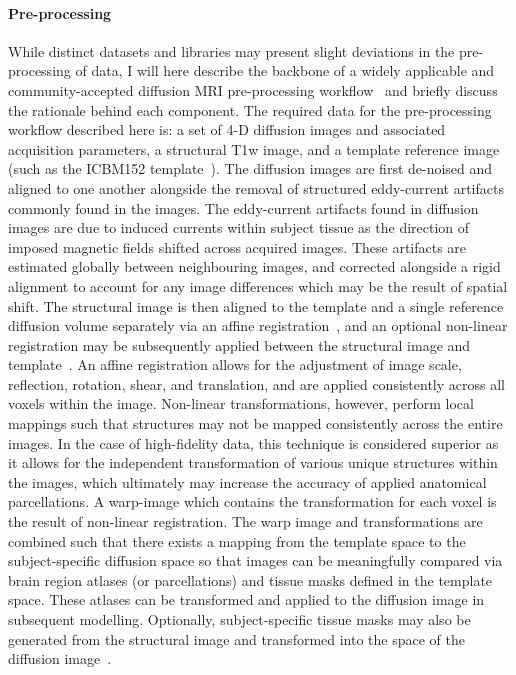 \paragraph*{Pre-processing}
While distinct datasets and libraries may present slight deviations in the pre-processing of data, I will here describe
the backbone of a widely applicable and community-accepted diffusion MRI pre-processing
workflow~\cite{WOOLRICH2009S173,jenkinson2012fsl,Glasser2013-vf} and briefly discuss the rationale behind each component.
The required data for the pre-processing workflow described here is: a set of 4-D diffusion images and associated
acquisition parameters, a structural T1w image, and a template reference image (such as the ICBM152
template~\cite{lancaster2007bias}). The diffusion images are first de-noised and aligned to one another alongside the
removal of structured eddy-current artifacts~\cite{andersson2016integrated} commonly found in the images. The
eddy-current artifacts found in diffusion images are due to induced currents within subject tissue as the direction of
imposed magnetic fields shifted across acquired images. These artifacts are estimated globally between neighbouring
images, and corrected alongside a rigid alignment to account for any image differences which may be the result of
spatial shift. The structural image is then aligned to the template and a single reference diffusion volume separately
via an affine registration~\cite{jenkinson2001global}, and an optional non-linear registration may be subsequently
applied between the structural image and template~\cite{jenkinson2012fsl}. An affine registration allows for the
adjustment of image scale, reflection, rotation, shear, and translation, and are applied consistently across all voxels
within the image. Non-linear transformations, however, perform local mappings such that structures may not be mapped
consistently across the entire images. In the case of high-fidelity data, this technique is considered superior as it
allows for the independent transformation of various unique structures within the images, which ultimately may increase
the accuracy of applied anatomical parcellations. A warp-image which contains the transformation for each voxel is the
result of non-linear registration. The warp image and transformations are combined such that there exists a mapping
from the template space to the subject-specific diffusion space so that images can be meaningfully compared via
brain region atlases (or parcellations) and tissue masks defined in the template space. These atlases can be transformed
and applied to the diffusion image in subsequent modelling. Optionally, subject-specific tissue masks may also be
generated from the structural image and transformed into the space of the diffusion image~\cite{zhang2001segmentation}.

